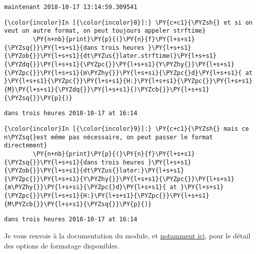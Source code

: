     \begin{Verbatim}[commandchars=\\\{\}]
maintenant 2018-10-17 13:14:59.309541

    \end{Verbatim}

    \begin{Verbatim}[commandchars=\\\{\}]
{\color{incolor}In [{\color{incolor}8}]:} \PY{c+c1}{\PYZsh{} et si on veut un autre format, on peut toujours appeler strftime}
        \PY{n+nb}{print}\PY{p}{(}\PY{n}{f}\PY{l+s+s1}{\PYZsq{}}\PY{l+s+s1}{dans trois heures }\PY{l+s+s1}{\PYZob{}}\PY{l+s+s1}{dt\PYZus{}later.strftime(}\PY{l+s+s1}{\PYZdq{}}\PY{l+s+s1}{\PYZpc{}}\PY{l+s+s1}{Y\PYZhy{}}\PY{l+s+s1}{\PYZpc{}}\PY{l+s+s1}{m\PYZhy{}}\PY{l+s+si}{\PYZpc{}d}\PY{l+s+s1}{ at }\PY{l+s+s1}{\PYZpc{}}\PY{l+s+s1}{H:}\PY{l+s+s1}{\PYZpc{}}\PY{l+s+s1}{M}\PY{l+s+s1}{\PYZdq{}}\PY{l+s+s1}{)\PYZcb{}}\PY{l+s+s1}{\PYZsq{}}\PY{p}{)}
\end{Verbatim}


    \begin{Verbatim}[commandchars=\\\{\}]
dans trois heures 2018-10-17 at 16:14

    \end{Verbatim}

    \begin{Verbatim}[commandchars=\\\{\}]
{\color{incolor}In [{\color{incolor}9}]:} \PY{c+c1}{\PYZsh{} mais ce n\PYZsq{}est même pas nécessaire, on peut passer le format directement}
        \PY{n+nb}{print}\PY{p}{(}\PY{n}{f}\PY{l+s+s1}{\PYZsq{}}\PY{l+s+s1}{dans trois heures }\PY{l+s+s1}{\PYZob{}}\PY{l+s+s1}{dt\PYZus{}later:}\PY{l+s+s1}{\PYZpc{}}\PY{l+s+s1}{Y\PYZhy{}}\PY{l+s+s1}{\PYZpc{}}\PY{l+s+s1}{m\PYZhy{}}\PY{l+s+si}{\PYZpc{}d}\PY{l+s+s1}{ at }\PY{l+s+s1}{\PYZpc{}}\PY{l+s+s1}{H:}\PY{l+s+s1}{\PYZpc{}}\PY{l+s+s1}{M\PYZcb{}}\PY{l+s+s1}{\PYZsq{}}\PY{p}{)}
\end{Verbatim}


    \begin{Verbatim}[commandchars=\\\{\}]
dans trois heures 2018-10-17 at 16:14

    \end{Verbatim}

    Je vous renvoie à la documentation du module, et
\href{https://docs.python.org/3/library/datetime.html\#strftime-and-strptime-behavior}{notamment
ici}, pour le détail des options de formatage disponibles.

